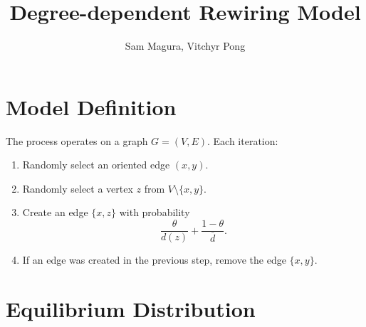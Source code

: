 \documentclass[a4paper,10pt]{article}
\title{Degree-dependent Rewiring Model}
\author{Sam Magura, Vitchyr Pong}
\begin{document}
\maketitle

\section{Model Definition}

The process operates on a graph $G = (V, E)$. Each iteration:

\begin{enumerate}
 \item Randomly select an oriented edge $(x, y)$.
 \item Randomly select a vertex $z$ from $V \setminus \{x, y\}$.
 \item Create an edge $\{x, z\}$ with probability
\begin{equation}
 \frac{\theta}{d(z)} + \frac{1 - \theta}{\overline{d}}.
\end{equation}
 \item If an edge was created in the previous step, remove the edge $\{x, y\}$.
\end{enumerate}

\section{Equilibrium Distribution}
\end{document}
